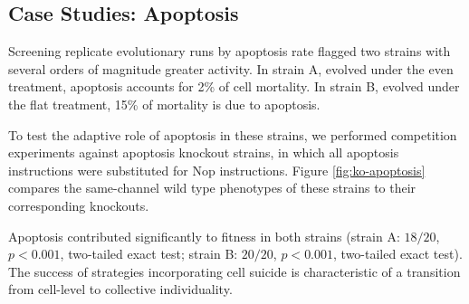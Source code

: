 \subsection{Case Studies: Apoptosis} \label{sec:apoptosis}



Screening replicate evolutionary runs by apoptosis rate flagged two strains with several orders of magnitude greater activity.
In strain A, evolved under the even treatment, apoptosis accounts for 2\% of cell mortality.
In strain B, evolved under the flat treatment, 15\% of mortality is due to apoptosis.

To test the adaptive role of apoptosis in these strains, we performed competition experiments against apoptosis knockout strains, in which all apoptosis instructions were substituted for Nop instructions.
Figure \ref{fig:ko-apoptosis} compares the same-channel wild type phenotypes of these strains to their corresponding knockouts.

Apoptosis contributed significantly to fitness in both strains (strain A: $18/20$, $p < 0.001$, two-tailed exact test; strain B: $20/20$, $p < 0.001$, two-tailed exact test).
The success of strategies incorporating cell suicide is characteristic of a transition from cell-level to collective individuality.
